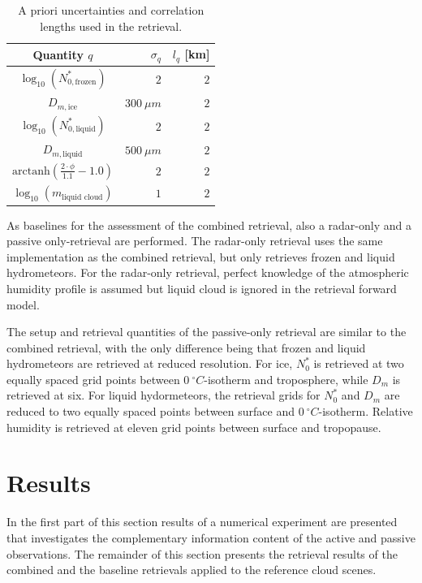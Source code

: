 \documentclass[journal abbreviation, manuscript]{copernicus}
\begin{document}
\begin{table}[h!]
\caption{A priori uncertainties and correlation
 lengths used in the retrieval.}
 \centering
\label{tab:a_priori}
    \begin{tabular}{c|r|r}
     Quantity $q$ & $\sigma_q$ & $l_q$ [km]\\
    \hline
    $\log_{10}(N_{0, \text{frozen}}^*)$    & $2$                       & $2$ \\
    $D_{m, \text{ice}}$               & $300\ \unit{\mu m}$ & $2$ \\
    $\log_{10}(N_{0, \text{liquid}}^*)$    & $2                      $ & $2$ \\
    $D_{m, \text{liquid}}$            & $500\ \unit{\mu m}$ & $2$ \\
    $\text{arctanh}(\frac{2 \cdot \phi}{1.1} - 1.0)$ & $2$                       & $2$ \\
    $\log_{10}(m_\text{liquid cloud}) $ & $1$                       & $2$ \\
    \end{tabular}
\end{table}

As baselines for the assessment of the combined retrieval, also a radar-only and
a passive only-retrieval are performed. The radar-only retrieval uses the same
implementation as the combined retrieval, but only retrieves frozen and liquid
hydrometeors. For the radar-only retrieval, perfect knowledge of the atmospheric
humidity profile is assumed but liquid cloud is ignored in the retrieval forward
model.

The setup and retrieval quantities of the passive-only retrieval are similar to
the combined retrieval, with the only difference being that frozen and liquid
hydrometeors are retrieved at reduced resolution. For ice, $N_0^*$ is retrieved
at two equally spaced grid points between $0\ \unit{^\circ C}$-isotherm and
troposphere, while $D_m$ is retrieved at six. For liquid hydormeteors, the
retrieval grids for $N_0^*$ and $D_m$ are reduced to two equally spaced points
between surface and $0\ \unit{^\circ C}$-isotherm. Relative humidity is retrieved
at eleven grid points between surface and tropopause.

\section{Results}
\label{sec:results}

In the first part of this section results of a numerical experiment are
presented that investigates the complementary information content of the active
and passive observations. The remainder of this section presents the retrieval
results of the combined and the baseline retrievals applied to the reference
cloud scenes.
\end{document}
